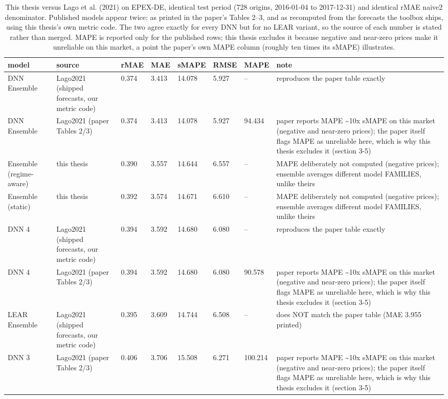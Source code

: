 \begin{table}[htbp]
\caption{This thesis versus Lago et al. (2021) on EPEX-DE, identical test period (728 origins, 2016-01-04 to 2017-12-31) and identical rMAE naive2 denominator. Published models appear twice: as printed in the paper's Tables 2--3, and as recomputed from the forecasts the toolbox ships, using this thesis's own metric code. The two agree exactly for every DNN but for no LEAR variant, so the source of each number is stated rather than merged. MAPE is reported only for the published rows; this thesis excludes it because negative and near-zero prices make it unreliable on this market, a point the paper's own MAPE column (roughly ten times its sMAPE) illustrates.}
\label{tab:lago-comparison}
\begin{tabular}{llllllll}
\toprule
model & source & rMAE & MAE & sMAPE & RMSE & MAPE & note \\
\midrule
DNN Ensemble & Lago2021 (shipped forecasts, our metric code) & 0.374 & 3.413 & 14.078 & 5.927 & -- & reproduces the paper table exactly \\
DNN Ensemble & Lago2021 (paper Tables 2/3) & 0.374 & 3.413 & 14.078 & 5.927 & 94.434 & paper reports MAPE \textasciitilde 10x sMAPE on this market (negative and near-zero prices); the paper itself flags MAPE as unreliable here, which is why this thesis excludes it (section 3-5) \\
Ensemble (regime-aware) & this thesis & 0.390 & 3.557 & 14.644 & 6.557 & -- & MAPE deliberately not computed (negative prices); ensemble averages different model FAMILIES, unlike theirs \\
Ensemble (static) & this thesis & 0.392 & 3.574 & 14.671 & 6.610 & -- & MAPE deliberately not computed (negative prices); ensemble averages different model FAMILIES, unlike theirs \\
DNN 4 & Lago2021 (shipped forecasts, our metric code) & 0.394 & 3.592 & 14.680 & 6.080 & -- & reproduces the paper table exactly \\
DNN 4 & Lago2021 (paper Tables 2/3) & 0.394 & 3.592 & 14.680 & 6.080 & 90.578 & paper reports MAPE \textasciitilde 10x sMAPE on this market (negative and near-zero prices); the paper itself flags MAPE as unreliable here, which is why this thesis excludes it (section 3-5) \\
LEAR Ensemble & Lago2021 (shipped forecasts, our metric code) & 0.395 & 3.609 & 14.744 & 6.508 & -- & does NOT match the paper table (MAE 3.955 printed) \\
DNN 3 & Lago2021 (paper Tables 2/3) & 0.406 & 3.706 & 15.508 & 6.271 & 100.214 & paper reports MAPE \textasciitilde 10x sMAPE on this market (negative and near-zero prices); the paper itself flags MAPE as unreliable here, which is why this thesis excludes it (section 3-5) \\

\end{tabular}
\end{table}
